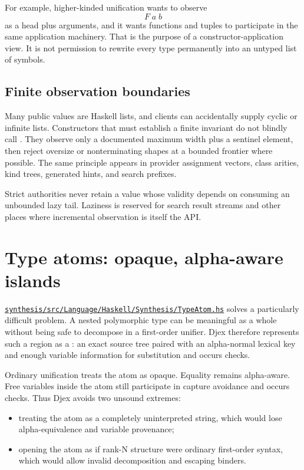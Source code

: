 \documentclass[10pt,letterpaper,oneside]{report}
\newcommand{\code}[1]{\texttt{\detokenize{#1}}}
\def\DjexBase{https://github.com/VladimirReshetnikov/Djex/blob/d3d9662598460316bdcd177ce6768c521e764aa8/}
\newcommand{\dpath}[1]{\href{\DjexBase#1}{\nolinkurl{#1}}}
\begin{document}
For example, higher-kinded unification wants to observe
\[
  F\;a\;b
\]
as a head plus arguments, and it wants functions and tuples to participate in the same application machinery. That is the purpose of a constructor-application view. It is not permission to rewrite every type permanently into an untyped list of symbols.

\subsection{Finite observation boundaries}

Many public values are Haskell lists, and clients can accidentally supply cyclic or infinite lists. Constructors that must establish a finite invariant do not blindly call \code{length}. They observe only a documented maximum width plus a sentinel element, then reject oversize or nonterminating shapes at a bounded frontier where possible. The same principle appears in provider assignment vectors, class arities, kind trees, generated hints, and search prefixes.

\begin{invariantbox}
Strict authorities never retain a value whose validity depends on consuming an unbounded lazy tail. Laziness is reserved for search result streams and other places where incremental observation is itself the API.
\end{invariantbox}

\section{Type atoms: opaque, alpha-aware islands}

\dpath{synthesis/src/Language/Haskell/Synthesis/TypeAtom.hs} solves a particularly difficult problem. A nested polymorphic type can be meaningful as a whole without being safe to decompose in a first-order unifier. Djex therefore represents such a region as a \code{TypeAtom}: an exact source tree paired with an alpha-normal lexical key and enough variable information for substitution and occurs checks.

Ordinary unification treats the atom as opaque. Equality remains alpha-aware. Free variables inside the atom still participate in capture avoidance and occurs checks. Thus Djex avoids two unsound extremes:

\begin{itemize}
  \item treating the atom as a completely uninterpreted string, which would lose alpha-equivalence and variable provenance;
  \item opening the atom as if rank-N structure were ordinary first-order syntax, which would allow invalid decomposition and escaping binders.
\end{itemize}
\end{document}
